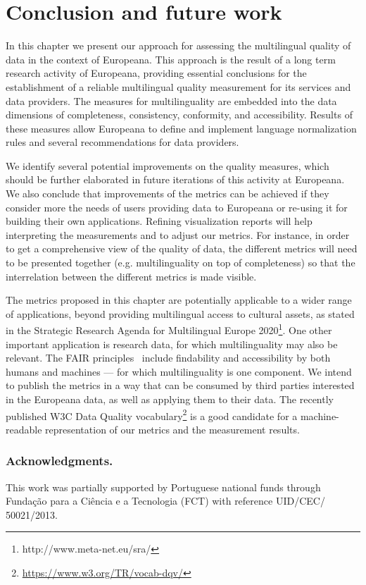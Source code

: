 
\section{Conclusion and future work}

In this chapter we present our approach for assessing the multilingual quality of data in the context of Europeana. This approach is the result of a long term research activity of Europeana, providing essential conclusions for the establishment of a reliable multilingual quality measurement for its services and data providers. The measures for multilinguality are embedded into the data dimensions of completeness, consistency, conformity, and accessibility. Results of these measures allow Europeana to define and implement language normalization rules and several recommendations for data providers.

We identify several potential improvements on the quality measures, which should be further elaborated in future iterations of this activity at Europeana. We also conclude that improvements of the metrics can be achieved if they consider more the needs of users providing data to Europeana or re-using it for building their own applications. Refining visualization reports will help interpreting the measurements and to adjust our metrics. For instance, in order to get a comprehensive view of the quality of data, the different metrics will need to be presented together (e.g. multilinguality on top of completeness) so that the interrelation between the different metrics is made visible. 

The metrics proposed in this chapter are potentially applicable to a wider range of applications, beyond providing multilingual access to cultural assets, as stated in the Strategic Research Agenda for Multilingual Europe 2020\footnote{http://www.meta-net.eu/sra/}. One other important application is research data, for which multilinguality may also be relevant. The FAIR principles~\cite{wilkinson2016} include findability and accessibility by both humans and machines --- for which multilinguality is one component. 
We intend to publish the metrics in a way that can be consumed by third parties interested in the Europeana data, as well as applying them to their data. The recently published W3C Data Quality vocabulary\footnote{ \url{https://www.w3.org/TR/vocab-dqv/}} is a good candidate for a machine-readable representation of our metrics and the measurement results.

\subsubsection{Acknowledgments.} This work was partially supported by Portuguese national funds through Fundação para a Ciência e a Tecnologia (FCT) with reference UID/CEC/
50021/2013.

% 
% 
